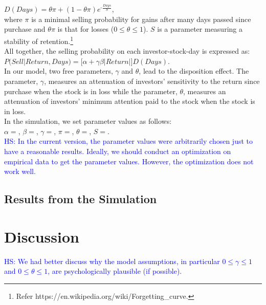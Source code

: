 \documentclass[11pt, a4paper]{article}
\newcommand{\HS}[1]{\textcolor{blue}{HS: #1}}
\begin{document}
\noindent
$D(Days)=\theta \pi + (1-\theta \pi) e^{\mbox{-}\frac{Days}{S}}$,\\
where $\pi$ is a minimal selling probability for gains after many days passed since purchase and $\theta \pi$ is that for losses ($0\leq \theta \leq 1$). $S$ is a parameter measuring a stability of retention.\footnote{Refer https://en.wikipedia.org/wiki/Forgetting\_curve.}\\

All together, the selling probability on each investor-stock-day is expressed as:\\

\noindent
$P(Sell|Return, Days)=\bigg[\alpha+\gamma \beta |Return|\bigg]D(Days)$.\\

In our model, two free parameters, $\gamma$ and $\theta$, lead to the disposition effect. The parameter, $\gamma$,  measures an attenuation of investors' sensitivity to the return since purchase when the stock is in loss while the parameter, $\theta$, measures an attenuation of investors' minimum attention paid to the stock when the stock is in loss. \\

In the simulation, we set parameter values as follows:\\
$\alpha=$, $\beta=$, $\gamma=$, $\pi=$, $\theta=$, $S=$. \\
\HS{In the current version, the parameter values were arbitrarily chosen just to have a reasonable results. Ideally, we should conduct an optimization on empirical data to get the parameter values. However, the optimization does not work well.}




\subsection{Results from the Simulation}




\section{Discussion}
\HS{We had better discuss why the model assumptions, in particular $0\leq \gamma \leq 1$ and $0\leq \theta \leq 1$, are psychologically plausible (if possible).}
\end{document}
